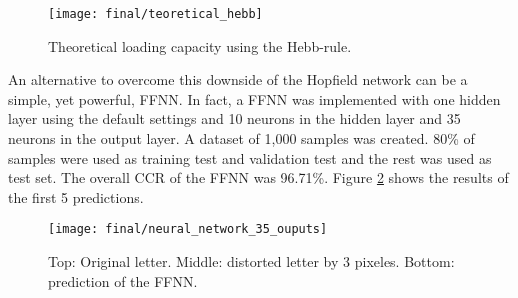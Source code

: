 \begin{figure}[!htbp]
\caption{Theoretical loading capacity using the Hebb-rule.}
\label{teoretical_hebb}
\medbreak
\texttt{[image: final/teoretical\_hebb]}
\centering
\end{figure}
\bigbreak
An alternative to overcome this downside of the Hopfield network can be a simple, yet powerful, FFNN. In fact, a FFNN was implemented with one hidden layer  using the default settings and 10 neurons in the hidden layer and 35 neurons in the output layer. A dataset of 1,000 samples was created. 80\% of samples were used as training test and validation test and the rest was used as test set. The overall CCR of the FFNN was 96.71\%. Figure \ref{neural_network_35_ouputs} shows the results of the first 5 predictions.
\bigbreak
\begin{figure}[!htbp]
\caption{Top: Original letter. Middle: distorted letter by 3 pixeles. Bottom: prediction of the FFNN.}
\label{neural_network_35_ouputs}
\medbreak
\texttt{[image: final/neural\_network\_35\_ouputs]}
\centering
\end{figure}
